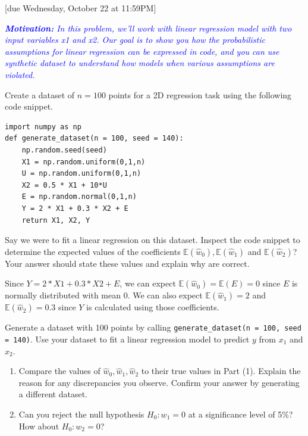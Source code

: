 \documentclass{article}
\newcommand{\E}{\mathbb{E}}
\begin{document}
[due Wednesday, October 22 at 11:59PM]

\begin{probset}
\begin{prob} 
    \textit{\textcolor{blue}{\textbf{Motivation:} In this problem, we'll work with linear regression model with two input variables x1 and x2. Our goal is to show you how the probabilistic assumptions for linear regression can be expressed in code, and you can use synthetic dataset to understand how models when various assumptions are violated.}}

    Create a dataset of $n = 100$ points for a 2D regression task using the following code snippet.

    \begin{lstlisting}
import numpy as np
def generate_dataset(n = 100, seed = 140):
    np.random.seed(seed)
    X1 = np.random.uniform(0,1,n)
    U = np.random.uniform(0,1,n)
    X2 = 0.5 * X1 + 10*U
    E = np.random.normal(0,1,n)
    Y = 2 * X1 + 0.3 * X2 + E
    return X1, X2, Y
    \end{lstlisting}

    \begin{subprobset}
        \begin{subprob}
            Say we were to fit a linear regression on this dataset. Inspect the code snippet to determine the expected values of the coefficients $\E(\hat{w}_0), \E(\hat{w}_1)$ and $\E(\hat{w}_2)$? Your answer should state these values and explain why are correct.

            \begin{soln}
                Since $Y = 2 * X1 + 0.3 * X2 + E$, we can expect $\E(\hat{w}_0) = \E(E) = 0$ since $E$ is normally distributed with mean 0. We can also expect $\E(\hat{w}_1) = 2$ and $\E(\hat{w}_2) = 0.3$ since $Y$ is calculated using those coefficients.
            \end{soln}
        \end{subprob}

        \begin{subprob}
            Generate a dataset with 100 points by calling \texttt{generate\_dataset(n = 100, seed = 140)}. Use your dataset to fit a linear regression model to predict $y$ from $x_1$ and $x_2$.

            \begin{enumerate}[label=\roman*.]
                \item Compare the values of $\hat{w}_0, \hat{w}_1, \hat{w}_2$ to their true values in Part (1). Explain the reason for
                any discrepancies you observe. Confirm your answer by generating a different dataset.
                \item Can you reject the null hypothesis $H_0 : w_1 = 0$ at a significance level of 5\%? How about
                $H_0 : w_2 = 0$?
            \end{enumerate}


\end{subprob}
\end{subprobset}
\end{prob}
\end{probset}
\end{document}
